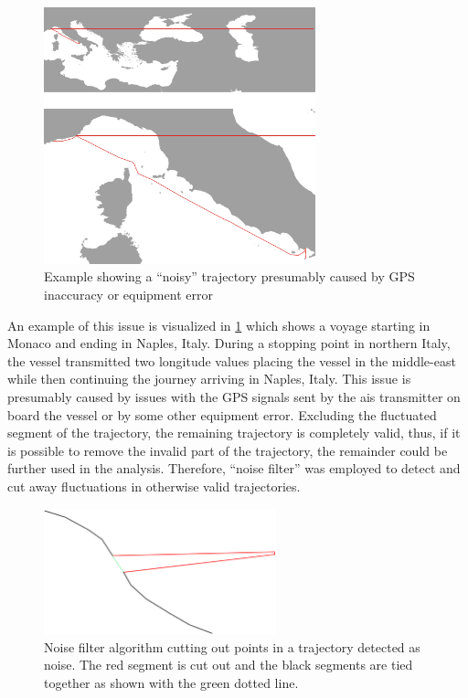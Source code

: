 \begin{figure}[htbp]  %
    \centering
    \includegraphics[width=0.7\textwidth]{figures/trajectory_noise/noisy_trajectory}
    \caption{Example showing a ``noisy'' trajectory presumably caused by GPS inaccuracy or equipment error}
    \label{fig:noisy_trajectory}
\end{figure}

An example of this issue is visualized in \cref{fig:noisy_trajectory} which shows a voyage starting in Monaco and ending in Naples, Italy. During a stopping point in northern Italy, the vessel transmitted two longitude values placing the vessel in the middle-east while then continuing the journey arriving in Naples, Italy. This issue is presumably caused by issues with the GPS signals sent by the \acrshort{ais} transmitter on board the vessel or by some other equipment error. Excluding the fluctuated segment of the trajectory, the remaining trajectory is completely valid, thus, if it is possible to remove the invalid part of the trajectory, the remainder could be further used in the analysis. Therefore, ``noise filter'' was employed to detect and cut away fluctuations in otherwise valid trajectories.

\begin{figure}[htbp]  %
    \centering
    \includegraphics[width=0.6\textwidth]{figures/trajectory_noise/noise_filter}
    \caption{Noise filter algorithm cutting out points in a trajectory detected as noise. The red segment is cut out and the black segments are tied together as shown with the green dotted line.}
    \label{fig:noise_filter}
\end{figure}

